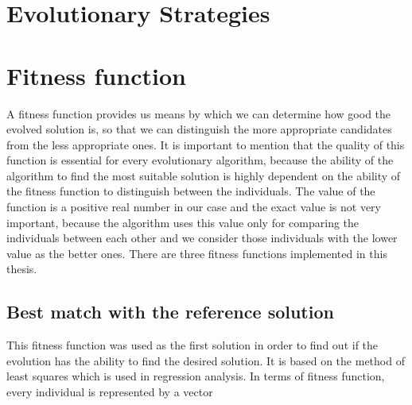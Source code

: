 \section{Evolutionary Strategies}


\section{Fitness function}
A fitness function provides us means by which we can determine how good the evolved solution is, so that we can distinguish the more appropriate candidates from the less appropriate ones. It is important to mention that the quality of this function is essential for every evolutionary algorithm, because the ability of the algorithm to find the most suitable solution is highly dependent on the ability of the fitness function to distinguish between the individuals. The value of the function is a positive real number in our case and the exact value is not very important, because the algorithm uses this value only for comparing the individuals between each other and we consider those individuals with the lower value as the better ones. There are three fitness functions implemented in this thesis.
\subsection{Best match with the reference solution}
This fitness function was used as the first solution in order to find out if the evolution has the ability to find the desired solution. It is based on the method of least squares which is used in regression analysis. 
In terms of fitness function, every individual is represented by a vector 

